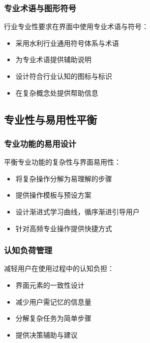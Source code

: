 \subsubsection{专业术语与图形符号}\label{ux4e13ux4e1aux672fux8bedux4e0eux56feux5f62ux7b26ux53f7}

行业专业性要求在界面中使用专业术语与符号：

\begin{itemize}
\tightlist
\item
  采用水利行业通用符号体系与术语
\item
  为专业术语提供辅助说明
\item
  设计符合行业认知的图标与标识
\item
  在复杂概念处提供帮助信息
\end{itemize}

\subsection{专业性与易用性平衡}\label{ux4e13ux4e1aux6027ux4e0eux6613ux7528ux6027ux5e73ux8861}

\subsubsection{专业功能的易用设计}\label{ux4e13ux4e1aux529fux80fdux7684ux6613ux7528ux8bbeux8ba1}

平衡专业功能的复杂性与界面易用性：

\begin{itemize}
\tightlist
\item
  将复杂操作分解为易理解的步骤
\item
  提供操作模板与预设方案
\item
  设计渐进式学习曲线，循序渐进引导用户
\item
  针对高频专业操作提供快捷方式
\end{itemize}

\subsubsection{认知负荷管理}\label{ux8ba4ux77e5ux8d1fux8377ux7ba1ux7406}

减轻用户在使用过程中的认知负担：

\begin{itemize}
\tightlist
\item
  界面元素的一致性设计
\item
  减少用户需记忆的信息量
\item
  分解复杂任务为简单步骤
\item
  提供决策辅助与建议
\end{itemize}

